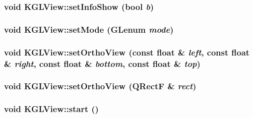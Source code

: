 \hypertarget{class_k_g_l_view_f9d4eb0a56f1554b348e346cd2342af3}{
\subsubsection[{setInfoShow}]{\setlength{\rightskip}{0pt plus 5cm}void KGLView::setInfoShow (bool {\em b})}}
\label{class_k_g_l_view_f9d4eb0a56f1554b348e346cd2342af3}


\hypertarget{class_k_g_l_view_ec41126c626102bf54b1188714fc4a4f}{
\subsubsection[{setMode}]{\setlength{\rightskip}{0pt plus 5cm}void KGLView::setMode (GLenum {\em mode})}}
\label{class_k_g_l_view_ec41126c626102bf54b1188714fc4a4f}


\hypertarget{class_k_g_l_view_ffc9ca060284bb6f24f2c415710f7b35}{
\subsubsection[{setOrthoView}]{\setlength{\rightskip}{0pt plus 5cm}void KGLView::setOrthoView (const float \& {\em left}, \/  const float \& {\em right}, \/  const float \& {\em bottom}, \/  const float \& {\em top})}}
\label{class_k_g_l_view_ffc9ca060284bb6f24f2c415710f7b35}


\hypertarget{class_k_g_l_view_841482c1c522ea0fd6d0cbb7f8515613}{
\subsubsection[{setOrthoView}]{\setlength{\rightskip}{0pt plus 5cm}void KGLView::setOrthoView (QRectF \& {\em rect})}}
\label{class_k_g_l_view_841482c1c522ea0fd6d0cbb7f8515613}


\hypertarget{class_k_g_l_view_3efd71e05da0e8ee7410ced9f1061090}{
\subsubsection[{start}]{\setlength{\rightskip}{0pt plus 5cm}void KGLView::start ()}}
\label{class_k_g_l_view_3efd71e05da0e8ee7410ced9f1061090}


